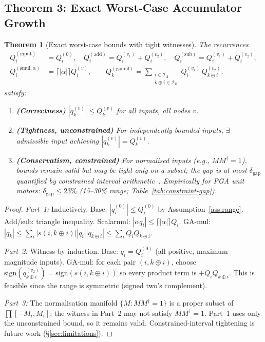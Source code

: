 \documentclass[11pt,a4paper]{article}
\theoremstyle{definition}
\theoremstyle{plain}
\newtheorem{theorem}{Theorem}[section]
\theoremstyle{remark}
\begin{document}
\subsection{Theorem 3: Exact Worst-Case Accumulator Growth}
\label{sec:growth}

\begin{theorem}[Exact worst-case bounds with tight witnesses]
\label{thm:growth}
The recurrences
\begin{align}
  Q_i^{(\mathrm{input})} &= Q_i^{(0)}, \quad
  Q_i^{(\mathrm{add})} = Q_i^{(v_1)}+Q_i^{(v_2)}, \quad
  Q_i^{(\mathrm{sub})} = Q_i^{(v_1)}+Q_i^{(v_2)},
    \label{eq:rec-linear}\\
  Q_i^{(\mathrm{smul},\alpha)} &= \lceil|\alpha|\rceil Q_i^{(v)}, \qquad
  Q_k^{(\mathrm{gamul})} = \!\sum_{\substack{i\in\mathcal{I}_A\\k\oplus i\in\mathcal{I}_B}}\!
    Q_i^{(v_1)}\,Q_{k\oplus i}^{(v_2)}.
    \label{eq:rec-gamul}
\end{align}
satisfy:
\begin{enumerate}
  \item \textbf{(Correctness)} $|q_k^{(v)}|\le Q_k^{(v)}$ for all inputs,
        all nodes $v$.
  \item \textbf{(Tightness, unconstrained)} For independently-bounded inputs,
        $\exists$ admissible input achieving $|q_k^{(v)}|=Q_k^{(v)}$.
  \item \textbf{(Conservatism, constrained)} For normalised inputs
        (e.g., $MM^\dagger=1$), bounds remain valid but may be tight
        only on a subset; the gap is at most $\delta_\mathrm{gap}$
        quantified by constrained interval arithmetic~\cite{rump1999}.
        Empirically for PGA unit motors: $\delta_\mathrm{gap}\le 23\%$
        (15--30\% range; Table~\ref{tab:constraint-gap}).
\end{enumerate}
\end{theorem}
\begin{proof}
\textit{Part~1:}
Inductively. Base: $|q_i^{(0)}|\le Q_i^{(0)}$ by Assumption~\ref{ass:range}.
Add/sub: triangle inequality.
Scalarmul: $|\alpha q_i|\le\lceil|\alpha|\rceil Q_i$.
GA-mul: $|q_k|\le\sum_i|s(i,k\oplus i)||q_i||q_{k\oplus i}|\le\sum_iQ_iQ_{k\oplus i}$.

\textit{Part~2:}
Witness by induction.
Base: $q_i=Q_i^{(0)}$ (all-positive, maximum-magnitude inputs).
GA-mul: for each pair $(i,k\oplus i)$, choose $\mathrm{sign}(q_{k\oplus i}^{(v_2)})
= \mathrm{sign}(s(i,k\oplus i))$ so every product term is $+Q_iQ_{k\oplus i}$.
This is feasible since the range is symmetric (signed two's complement).

\textit{Part~3:}
The normalisation manifold $\{M: MM^\dagger=1\}$ is a proper subset
of $\prod[-M_i,M_i]$; the witness in Part~2 may not satisfy $MM^\dagger=1$.
Part~1 uses only the unconstrained bound, so it remains valid.
Constrained-interval tightening is future work (\S\ref{sec:limitations}).
\end{proof}
\end{document}
